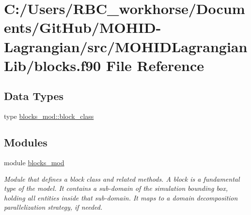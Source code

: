 \hypertarget{blocks_8f90}{}\section{C\+:/\+Users/\+R\+B\+C\+\_\+workhorse/\+Documents/\+Git\+Hub/\+M\+O\+H\+I\+D-\/\+Lagrangian/src/\+M\+O\+H\+I\+D\+Lagrangian\+Lib/blocks.f90 File Reference}
\label{blocks_8f90}
\subsection*{Data Types}
\begin{DoxyCompactItemize}
\item 
type \mbox{\hyperlink{structblocks__mod_1_1block__class}{blocks\+\_\+mod\+::block\+\_\+class}}
\end{DoxyCompactItemize}
\subsection*{Modules}
\begin{DoxyCompactItemize}
\item 
module \mbox{\hyperlink{namespaceblocks__mod}{blocks\+\_\+mod}}
\begin{DoxyCompactList}\small\item\em Module that defines a block class and related methods. A block is a fundamental type of the model. It contains a sub-\/domain of the simulation bounding box, holding all entities inside that sub-\/domain. It maps to a domain decomposition parallelization strategy, if needed. \end{DoxyCompactList}\end{DoxyCompactItemize}
